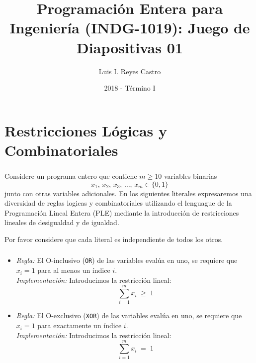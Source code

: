\documentclass[ 10pt, xcolor = dvipsnames]{beamer}
\title[\shorttitle]{Programaci\'on Entera para Ingenier\'ia (INDG-1019): \textbf{Juego de Diapositivas 01} }
\author[L. I. Reyes Castro]{Luis I. Reyes Castro}
\institute[ESPOL]{\normalsize Escuela Superior Polit\'ecnica del Litoral (ESPOL) \\ Guayaquil - Ecuador}
\date[2018-T1]{2018 - T\'ermino I}
\begin{document}




\section{Restricciones L\'ogicas y Combinatoriales}

\begin{frame}[allowframebreaks]
\frametitle{\insertsection}

Considere un programa entero que contiene $m \geq 10$ variables binarias
\[
x_1, \, x_2, \, x_3, \, \dots, \, x_m \in \{ 0, 1 \}
\]
junto con otras variables adicionales. En los siguientes literales expresaremos una diversidad de reglas logicas y combinatoriales utilizando el lenguague de la Programaci\'on Lineal Entera (PLE) mediante la introducci\'on de restricciones lineales de desigualdad y de igualdad. 

Por favor considere que cada literal es independiente de todos los otros. 

\end{frame}

\begin{frame}[allowframebreaks]
\frametitle{\insertsection}

\begin{itemize}
\item \emph{Regla:} El O-inclusivo (\texttt{OR}) de las variables eval\'ua en uno, \ie se requiere \linebreak que $x_i = 1$ para al menos un \'indice $i$. \\[1ex] \emph{Implementaci\'on:} Introducimos la restricci\'on lineal: 
\[
\sum_{i=1}^m x_i \; \geq \; 1
\]
\item \emph{Regla:} El O-exclusivo (\texttt{XOR}) de las variables eval\'ua en uno, \ie se requiere que $x_i = 1$ para exactamente un \'indice $i$. \\[1ex] \emph{Implementaci\'on:} Introducimos la restricci\'on lineal: 
\[
\sum_{i=1}^m x_i \; = \; 1
\]
\end{itemize}

\end{frame}
\end{document}
